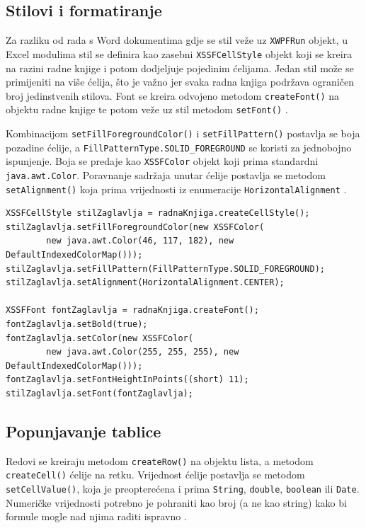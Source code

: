 \documentclass[]{foi}
\begin{document}
\subsection{Stilovi i formatiranje}

Za razliku od rada s Word dokumentima gdje se stil veže uz \texttt{XWPFRun} objekt, u Excel modulima stil se definira kao zasebni \texttt{XSSFCellStyle} objekt koji se kreira na razini radne knjige i potom dodjeljuje pojedinim ćelijama. Jedan stil može se primijeniti na više ćelija, što je važno jer svaka radna knjiga podržava ograničen broj jedinstvenih stilova. Font se kreira odvojeno metodom \texttt{createFont()} na objektu radne knjige te potom veže uz stil metodom \texttt{setFont()} \cite{apachePOISpreadsheetQuickGuide}.

Kombinacijom \texttt{setFillForegroundColor()} i \texttt{setFillPattern()} postavlja se boja pozadine ćelije, a \texttt{FillPatternType.SOLID\_FOREGROUND} se koristi za jednobojno ispunjenje. Boja se predaje kao \texttt{XSSFColor} objekt koji prima standardni \texttt{java.awt.Color}. Poravnanje sadržaja unutar ćelije postavlja se metodom \texttt{setAlignment()} koja prima vrijednosti iz enumeracije \texttt{HorizontalAlignment} \cite{apachePOISpreadsheetQuickGuide}.

\begin{lstlisting}[style=java, caption={Kreiranje stilova ćelija}]
XSSFCellStyle stilZaglavlja = radnaKnjiga.createCellStyle();
stilZaglavlja.setFillForegroundColor(new XSSFColor(
        new java.awt.Color(46, 117, 182), new DefaultIndexedColorMap()));
stilZaglavlja.setFillPattern(FillPatternType.SOLID_FOREGROUND);
stilZaglavlja.setAlignment(HorizontalAlignment.CENTER);

XSSFFont fontZaglavlja = radnaKnjiga.createFont();
fontZaglavlja.setBold(true);
fontZaglavlja.setColor(new XSSFColor(
        new java.awt.Color(255, 255, 255), new DefaultIndexedColorMap()));
fontZaglavlja.setFontHeightInPoints((short) 11);
stilZaglavlja.setFont(fontZaglavlja);
\end{lstlisting}

\subsection{Popunjavanje tablice}

Redovi se kreiraju metodom \texttt{createRow()} na objektu lista, a metodom \texttt{createCell()} ćelije na retku. Vrijednost ćelije postavlja se metodom \texttt{setCellValue()}, koja je preopterećena i prima \texttt{String}, \texttt{double}, \texttt{boolean} ili \texttt{Date}. Numeričke vrijednosti potrebno je pohraniti kao broj (a ne kao string) kako bi formule mogle nad njima raditi ispravno \cite{apachePOISpreadsheetQuickGuide}.
\end{document}
